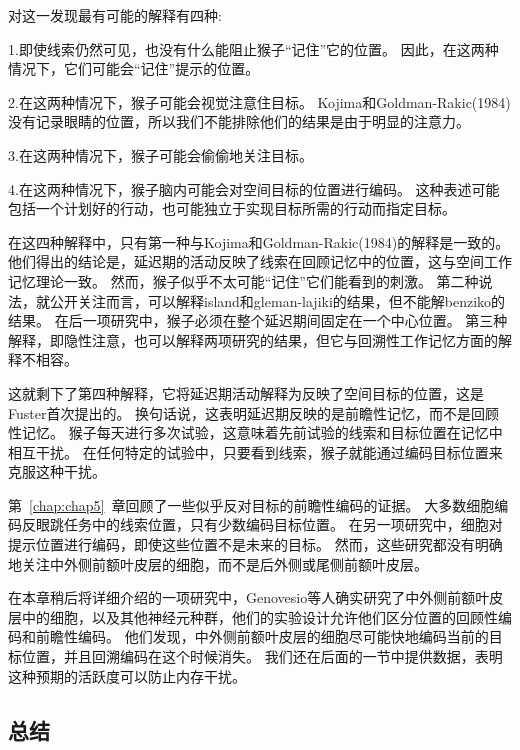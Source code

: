 对这一发现最有可能的解释有四种:
\par


1.即使线索仍然可见，也没有什么能阻止猴子“记住”它的位置。
因此，在这两种情况下，它们可能会“记住”提示的位置。
\par


2.在这两种情况下，猴子可能会视觉注意住目标。
Kojima和Goldman-Rakic(1984)没有记录眼睛的位置，所以我们不能排除他们的结果是由于明显的注意力。
\par


3.在这两种情况下，猴子可能会偷偷地关注目标。
\par


4.在这两种情况下，猴子脑内可能会对空间目标的位置进行编码。
这种表述可能包括一个计划好的行动，也可能独立于实现目标所需的行动而指定目标。


在这四种解释中，只有第一种与Kojima和Goldman-Rakic(1984)的解释是一致的。
他们得出的结论是，延迟期的活动反映了线索在回顾记忆中的位置，这与空间工作记忆理论一致。
然而，猴子似乎不太可能“记住”它们能看到的刺激。
第二种说法，就公开关注而言，可以解释island和gleman-lajiki的结果，但不能解benziko的结果。
在后一项研究中，猴子必须在整个延迟期间固定在一个中心位置。
第三种解释，即隐性注意，也可以解释两项研究的结果，但它与回溯性工作记忆方面的解释不相容。


这就剩下了第四种解释，它将延迟期活动解释为反映了空间目标的位置，这是Fuster\cite{fuster1973unit}首次提出的。
换句话说，这表明延迟期反映的是前瞻性记忆，而不是回顾性记忆。
猴子每天进行多次试验，这意味着先前试验的线索和目标位置在记忆中相互干扰。
在任何特定的试验中，只要看到线索，猴子就能通过编码目标位置来克服这种干扰。


第~\ref{chap:chap5}~章回顾了一些似乎反对目标的前瞻性编码的证据。
大多数细胞编码反眼跳任务中的线索位置，只有少数编码目标位置。
在另一项研究中，细胞对提示位置进行编码，即使这些位置不是未来的目标。
然而，这些研究都没有明确地关注中外侧前额叶皮层的细胞，而不是后外侧或尾侧前额叶皮层。


在本章稍后将详细介绍的一项研究中，Genovesio等人\cite{genovesio2006representation}确实研究了中外侧前额叶皮层中的细胞，以及其他神经元种群，他们的实验设计允许他们区分位置的回顾性编码和前瞻性编码。
他们发现，中外侧前额叶皮层的细胞尽可能快地编码当前的目标位置，并且回溯编码在这个时候消失。
我们还在后面的一节中提供数据，表明这种预期的活跃度可以防止内存干扰\cite{sakai2002active}。



\subsection{总结}

